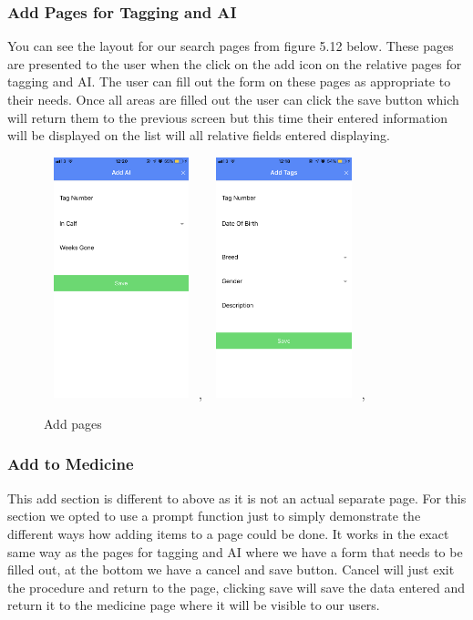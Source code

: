 \documentclass[12pt,a4paper,oneside,openany]{book}
\begin{document}
\subsubsection{Add Pages for Tagging and AI}
You can see the layout for our search pages from figure 5.12  below. These pages are presented to the user when the click on the add icon on the relative pages for tagging and AI. The user can fill out the form on these pages as appropriate to their needs. Once all areas are filled out the user can click the save button which will return them to the previous screen but this time their entered information will be displayed on the list will all relative fields entered displaying. 

\begin{figure}[ht]
\renewcommand\thefigure{5.16}
\centering
\includegraphics[width=4.5cm,height=7cm]{Images/addAI.png},
\includegraphics[width=4.5cm,height=7cm]{Images/addTags.png},
\caption{Add pages}
\label{add}
\end{figure}

\subsubsection{Add to Medicine}
This add section is different to above as it is not an actual separate page. For this section we opted to use a prompt function just to simply demonstrate the different ways how adding items to a page could be done. It works in the exact same way as the pages for tagging and AI where we have a form that needs to be filled out, at the bottom we have a cancel and save button. Cancel will just exit the procedure and return to the page, clicking save will save the data entered and return it to the medicine page where it will be visible to our users.
\end{document}
